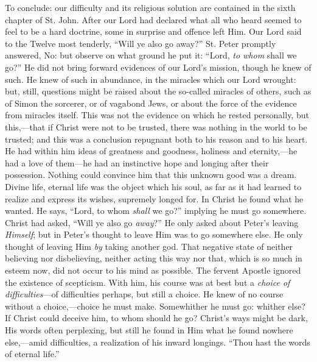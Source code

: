 To conclude: our difficulty and its religious solution are
contained in the sixth chapter of St. John. After our Lord had
declared what all who heard seemed to feel to be a hard doctrine, some
in surprise and offence left Him. Our Lord said to the Twelve most
tenderly, ``Will ye also go away?'' St. Peter promptly
answered, No: but observe on what ground he put it: ``Lord, \emph{to
whom} shall we go?'' He did not bring forward evidences of our
Lord's mission, though he knew of such. He knew of such in abundance,
in the miracles which our Lord wrought: but, still, questions might be
raised about the so-called miracles of others, such as of Simon the
sorcerer, or of vagabond Jews, or about the force of the evidence from
miracles itself. This was not the evidence on which he rested
personally, but this,—that if Christ were not to be trusted, there
was nothing in the world to be trusted; and this was a conclusion
repugnant both to his reason and to his heart. He had within him ideas
of greatness and goodness, holiness and eternity,—he had a love of
them—he had an instinctive hope and longing after their possession.
Nothing could convince him that this unknown good was a dream. Divine
life, eternal life was the object which his soul, as far as it had
learned to realize and express its wishes, supremely longed for. In
Christ he found what he wanted. He says, ``Lord, to whom \emph{shall}
we go?'' implying he must go somewhere. Christ had asked,
``Will ye also go \emph{away}?'' He only asked about Peter's
leaving \emph{Himself}; but in Peter's thought to leave Him was to go
somewhere else. He only thought of leaving Him \emph{by} taking
another god. That negative state of neither believing nor
disbelieving, neither acting this way nor that, which is so much in
esteem now, did not occur to his mind as possible. The fervent Apostle
ignored the existence of scepticism. With him, his course was at best
but a \emph{choice of difficulties}—of difficulties perhaps, but
still a choice. He knew of no course without a choice,—choice he
must make. Somewhither he must go: whither else? If Christ could
deceive him, to whom should he go? Christ's ways might be dark, His
words often perplexing, but still he found in Him what he found
nowhere else,—amid difficulties, a realization of his inward
longings. ``Thou hast the words of eternal life.''

